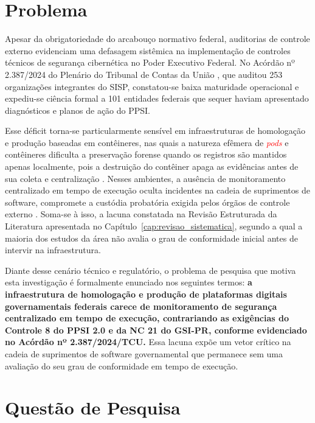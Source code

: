 \section{Problema}
\label{sec:intro_problema}

Apesar da obrigatoriedade do arcabouço normativo federal, auditorias de controle externo evidenciam uma defasagem sistêmica na implementação de controles técnicos de segurança cibernética no Poder Executivo Federal. No Acórdão nº 2.387/2024 do Plenário do Tribunal de Contas da União \cite{tcu2387_2024}, que auditou 253 organizações integrantes do SISP, constatou-se baixa maturidade operacional e expediu-se ciência formal a 101 entidades federais que sequer haviam apresentado diagnósticos e planos de ação do PPSI.

Esse déficit torna-se particularmente sensível em infraestruturas de homologação e produção baseadas em contêineres, nas quais a natureza efêmera de \textcolor{red}{\textit{pods}}  e contêineres dificulta a preservação forense quando os registros são mantidos apenas localmente, pois a destruição do contêiner apaga as evidências antes de sua coleta e centralização \cite{jin2025,zhang2025}. Nesses ambientes, a ausência de monitoramento centralizado em tempo de execução oculta incidentes na cadeia de suprimentos de software, compromete a custódia probatória exigida pelos órgãos de controle externo \cite{tcu2387_2024,lgpd2018}. Soma-se à isso, a lacuna constatada na Revisão Estruturada da Literatura apresentada no Capítulo~\ref{cap:revisao_sistematica}, segundo a qual a maioria dos estudos da área não avalia o grau de conformidade inicial antes de intervir na infraestrutura.

Diante desse cenário técnico e regulatório, o problema de pesquisa que motiva esta investigação é formalmente enunciado nos seguintes termos: \textbf{a infraestrutura de homologação e produção de plataformas digitais governamentais federais carece de monitoramento de segurança centralizado em tempo de execução, contrariando as exigências do Controle 8 do PPSI 2.0 e da NC 21 do GSI-PR, conforme evidenciado no Acórdão nº 2.387/2024/TCU.} Essa lacuna expõe um vetor crítico na cadeia de suprimentos de software governamental que permanece sem uma avaliação do seu grau de conformidade em tempo de execução.

\section{Questão de Pesquisa}
\label{sec:intro_questao_pesquisa}

